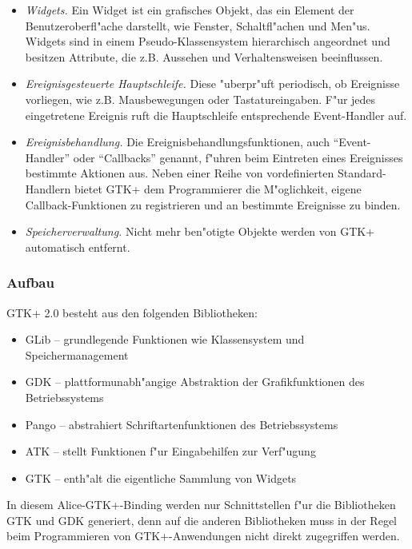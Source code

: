 \documentclass[a4paper,titlepage]{article}
\begin{document}
\begin{itemize}
\item \emph{Widgets.}
      Ein Widget ist ein grafisches Objekt, das ein
      Element der Benutzeroberfl"ache darstellt, wie
      Fenster, Schaltfl"achen und Men"us.
      Widgets sind in einem Pseudo-Klassensystem hierarchisch angeordnet
      und besitzen Attribute, die
      z.B. Aussehen und Verhaltensweisen beeinflussen.

\item \emph{Ereignisgesteuerte Hauptschleife.} 
      Diese "uberpr"uft periodisch, ob Ereignisse vorliegen, wie z.B.
      Mausbewegungen oder Tastatureingaben.
      F"ur jedes eingetretene Ereignis ruft die Hauptschleife
      entsprechende Event-Handler auf.

\item \emph{Ereignisbehandlung.}
      Die Ereignisbehandlungsfunktionen, auch ``Event-Handler'' oder
      ``Callbacks'' genannt, f"uhren beim Eintreten eines Ereignisses
      bestimmte Aktionen aus.
      Neben einer Reihe von vordefinierten Standard-Handlern bietet GTK+
      dem Programmierer die M"oglichkeit, eigene Callback-Funktionen
      zu registrieren und an bestimmte Ereignisse zu binden.

\item \emph{Speicherverwaltung.} Nicht mehr ben"otigte Objekte werden von
      GTK+ automatisch entfernt.

\end{itemize}

\subsubsection*{Aufbau}
GTK+ 2.0 besteht aus den folgenden Bibliotheken:

\begin{itemize}
\item GLib -- grundlegende Funktionen wie Klassensystem und
      Speichermanagement
\item GDK -- plattformunabh"angige Abstraktion der Grafikfunktionen
      des Betriebssystems
\item Pango -- abstrahiert Schriftartenfunktionen des Betriebssystems
\item ATK -- stellt Funktionen f"ur Eingabehilfen zur Verf"ugung
\item GTK -- enth"alt die eigentliche Sammlung von Widgets
\end{itemize}

In diesem Alice-GTK+-Binding werden nur Schnittstellen f"ur die Bibliotheken
GTK und GDK generiert, denn auf die anderen Bibliotheken muss in der Regel beim
Programmieren von GTK+-Anwendungen nicht direkt zugegriffen werden.
\end{document}
